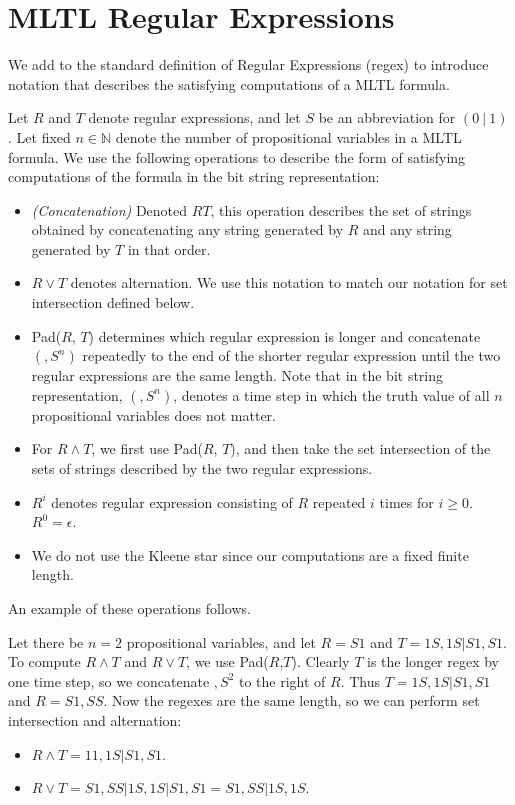 \documentclass[runningheads]{llncs}
\begin{document}
\section{MLTL Regular Expressions} \label{regex}
We add to the standard definition of Regular Expressions (regex) \cite{sipser} to introduce notation that describes the satisfying computations of a MLTL formula.
\begin{definition}
Let $R$ and $T$ denote regular expressions, and let $S$ be an abbreviation for $(0 \ | \ 1)$. Let fixed $n \in \mathbb{N}$ denote the number of propositional variables in a MLTL formula. We use the following operations to describe the form of satisfying computations of the formula in the bit string representation:
\begin{itemize}
  \item \emph{(Concatenation)} Denoted $RT$, this operation describes the set of strings obtained by concatenating any string generated by $R$ and any string generated by $T$ in that order.
    \item $R \lor T$ denotes alternation. We use this notation to match our notation for set intersection defined below.
    \item Pad($R$, $T$) determines which regular expression is longer and concatenate $(,S^n)$ repeatedly to the end of the shorter regular expression until the two regular expressions are the same length. Note that in the bit string representation, $(,S^n)$, denotes a time step in which the truth value of all $n$ propositional variables does not matter.
    \item For $R \land T$, we first use Pad($R$, $T$), and then take the set intersection of the sets of strings described by the two regular expressions.
      \item $R^i$ denotes regular expression consisting of $R$ repeated $i$ times for $i \geq 0$. $R^0 = \epsilon$. %
    \item We do not use the Kleene star since our computations are a fixed finite length.
\end{itemize}
\end{definition}
An example of these operations follows.
\begin{example}
Let there be $n = 2$ propositional variables, and let $R = S1$ and $T = 1S,1S | S1,S1$.\\
To compute $R \land T$ and $R \lor T$, we use Pad($R$,$T$). Clearly $T$ is the longer regex by one time step, so we concatenate $,S^2$ to the right of $R$. Thus $T =1S,1S | S1,S1$ and $R = S1,SS$. Now the regexes are the same length, so we can perform set intersection and alternation:
\begin{itemize}
    \item $R \land T = 11,1S | S1, S1$.
    \item $R \lor T = S1,SS | 1S,1S | S1,S1 = S1,SS | 1S,1S$.
\end{itemize}
\end{example}
\end{document}
